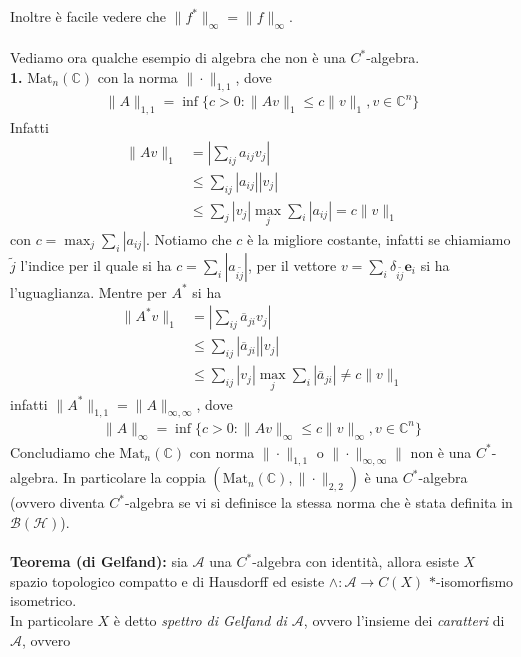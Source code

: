 \documentclass{article}
\numberwithin{equation}{subsection}
\begin{document}
Inoltre è facile vedere che $\|f^*\|_\infty = \|f\|_\infty$. \\ \\
Vediamo ora qualche esempio di algebra che non è una $C^*$-algebra. \\
\textbf{1.} $\mathrm{Mat}_n(\mathbb{C})$ con la norma $\|\cdot\|_{1, 1}$, dove 
\begin{align*}
    \|A\|_{1, 1} = \inf\{c > 0 : \|Av\|_1 \leq c\|v\|_1, v \in \mathbb{C}^n\}
\end{align*}
Infatti 
\begin{align*}
    \|Av\|_1 &= \left|\sum_{ij} a_{ij}v_j\right| \\
    &\leq \sum_{ij}|a_{ij}||v_j| \\
    &\leq \sum_j |v_j| \max_j \sum_i |a_{ij}| = c\|v\|_1
\end{align*}
con $c = \max_j \sum_i |a_{ij}|$. Notiamo che $c$ è la migliore costante, infatti se chiamiamo $\widetilde{j}$ l'indice per il quale si ha $c = \sum_i |a_{i\widetilde{j}}|$, per il vettore $v = \sum_{i}\delta_{i\widetilde{j}}\mathbf{e}_i$ si ha l'uguaglianza.
Mentre per $A^*$ si ha 
\begin{align*}
    \|A^*v\|_1 &= \left|\sum_{ij}\overline{a}_{ji}v_j\right| \\
    &\leq \sum_{ij}|\overline{a}_{ji}||v_j| \\
    &\leq \sum_{ij}|v_j| \max_j\sum_i |\overline{a}_{ji}| \neq c\|v\|_1
\end{align*}
infatti $\|A^*\|_{1, 1} = \|A\|_{\infty, \infty}$, dove 
\begin{align*}
    \|A\|_{\infty} = \inf\{c > 0 : \|Av\|_\infty \leq c\|v\|_\infty, v \in \mathbb{C}^n\}
\end{align*}
Concludiamo che $\mathrm{Mat}_n(\mathbb{C})$ con norma $\|\cdot\|_{1, 1}$ o $\|\cdot\|_{\infty, \infty}\|$ non è una $C^*$-algebra. In particolare la coppia $(\mathrm{Mat}_n(\mathbb{C}), \|\cdot\|_{2, 2})$ è una $C^*$-algebra (ovvero diventa $C^*$-algebra se vi si definisce la stessa norma che è stata definita in $\mathcal{B}(\mathcal{H})$). \\ \\
\textbf{Teorema (di Gelfand):} sia $\mathscr{A}$ una $C^*$-algebra con identità, allora esiste $X$ spazio topologico compatto e di Hausdorff ed esiste $\wedge : \mathscr{A} \longrightarrow C(X)$ $*$-isomorfismo isometrico. \\
In particolare $X$ è detto \textit{spettro di Gelfand di $\mathscr{A}$}, ovvero l'insieme dei \textit{caratteri} di $\mathscr{A}$, ovvero
\end{document}
